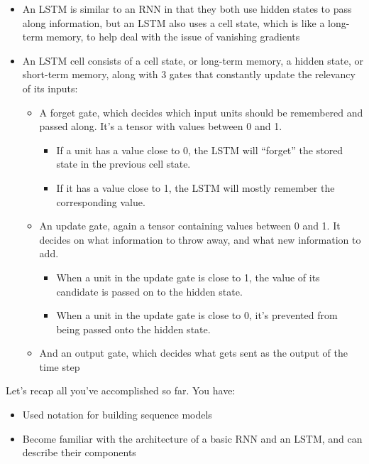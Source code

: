 \documentclass[11pt]{article}
\providecommand{\tightlist}{%
      \setlength{\itemsep}{0pt}\setlength{\parskip}{0pt}}
\begin{document}
\begin{itemize}
\tightlist
\item
  An LSTM is similar to an RNN in that they both use hidden states to
  pass along information, but an LSTM also uses a cell state, which is
  like a long-term memory, to help deal with the issue of vanishing
  gradients
\item
  An LSTM cell consists of a cell state, or long-term memory, a hidden
  state, or short-term memory, along with 3 gates that constantly update
  the relevancy of its inputs:

  \begin{itemize}
  \tightlist
  \item
    A forget gate, which decides which input units should be remembered
    and passed along. It's a tensor with values between 0 and 1.

    \begin{itemize}
    \tightlist
    \item
      If a unit has a value close to 0, the LSTM will ``forget'' the
      stored state in the previous cell state.
    \item
      If it has a value close to 1, the LSTM will mostly remember the
      corresponding value.
    \end{itemize}
  \item
    An update gate, again a tensor containing values between 0 and 1. It
    decides on what information to throw away, and what new information
    to add.

    \begin{itemize}
    \tightlist
    \item
      When a unit in the update gate is close to 1, the value of its
      candidate is passed on to the hidden state.
    \item
      When a unit in the update gate is close to 0, it's prevented from
      being passed onto the hidden state.
    \end{itemize}
  \item
    And an output gate, which decides what gets sent as the output of
    the time step
  \end{itemize}
\end{itemize}

Let's recap all you've accomplished so far. You have:

\begin{itemize}
\tightlist
\item
  Used notation for building sequence models
\item
  Become familiar with the architecture of a basic RNN and an LSTM, and
  can describe their components
\end{itemize}
\end{document}
